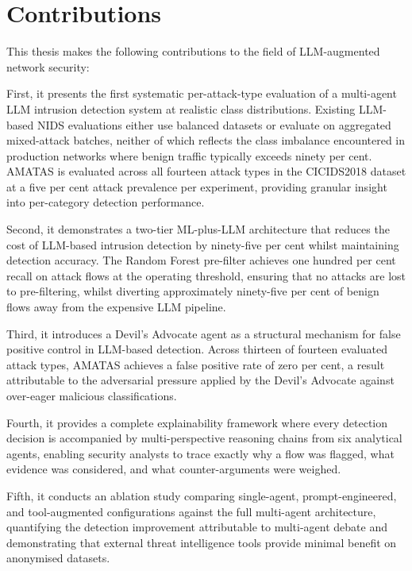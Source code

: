 \section{Contributions}
\label{sec:contributions}

This thesis makes the following contributions to the field of LLM-augmented network security:

First, it presents the first systematic per-attack-type evaluation of a multi-agent LLM intrusion detection system at realistic class distributions. Existing LLM-based NIDS evaluations either use balanced datasets or evaluate on aggregated mixed-attack batches, neither of which reflects the class imbalance encountered in production networks where benign traffic typically exceeds ninety per cent. AMATAS is evaluated across all fourteen attack types in the CICIDS2018 dataset at a five per cent attack prevalence per experiment, providing granular insight into per-category detection performance.

Second, it demonstrates a two-tier ML-plus-LLM architecture that reduces the cost of LLM-based intrusion detection by ninety-five per cent whilst maintaining detection accuracy. The Random Forest pre-filter achieves one hundred per cent recall on attack flows at the operating threshold, ensuring that no attacks are lost to pre-filtering, whilst diverting approximately ninety-five per cent of benign flows away from the expensive LLM pipeline.

Third, it introduces a Devil's Advocate agent as a structural mechanism for false positive control in LLM-based detection. Across thirteen of fourteen evaluated attack types, AMATAS achieves a false positive rate of zero per cent, a result attributable to the adversarial pressure applied by the Devil's Advocate against over-eager malicious classifications.

Fourth, it provides a complete explainability framework where every detection decision is accompanied by multi-perspective reasoning chains from six analytical agents, enabling security analysts to trace exactly why a flow was flagged, what evidence was considered, and what counter-arguments were weighed.

Fifth, it conducts an ablation study comparing single-agent, prompt-engineered, and tool-augmented configurations against the full multi-agent architecture, quantifying the detection improvement attributable to multi-agent debate and demonstrating that external threat intelligence tools provide minimal benefit on anonymised datasets.

